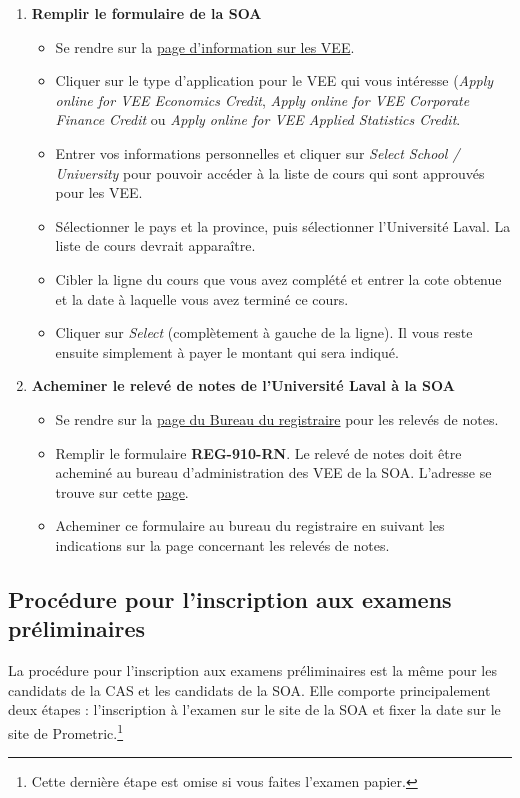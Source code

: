 \begin{enumerate}
\item \textbf{Remplir le formulaire de la SOA}
\begin{itemize}
\item Se rendre sur la \href{https://soa.org/education/exam-req/edu-vee.aspx}{page d'information sur les VEE}. 
\item Cliquer sur le type d'application pour le VEE qui vous intéresse (\textit{Apply online for VEE Economics Credit}, \textit{Apply online for VEE Corporate Finance Credit} ou \textit{Apply online for VEE Applied Statistics Credit}.
\item Entrer vos informations personnelles et cliquer sur \textit{Select School / University} pour pouvoir accéder à la liste de cours qui sont approuvés pour les VEE.
\item Sélectionner le pays et la province, puis sélectionner l'Université Laval. La liste de cours devrait apparaître. \item Cibler la ligne du cours que vous avez complété et entrer la cote obtenue et la date à laquelle vous avez terminé ce cours. 
\item Cliquer sur \textit{Select} (complètement à gauche de la ligne). Il vous reste ensuite simplement à payer le montant qui sera indiqué.
\end{itemize}\vspace{\baselineskip}
\item \textbf{Acheminer le relevé de notes de l'Université Laval à la SOA}
\begin{itemize}
\item Se rendre sur la \href{https://www.reg.ulaval.ca/cms/DemDoc/releveNotes}{page du Bureau du registraire} pour les relevés de notes.
\item Remplir le formulaire \textbf{REG-910-RN}. Le relevé de notes doit être acheminé au bureau d'administration des VEE de la SOA. L'adresse se trouve sur cette \href{https://soa.org/education/exam-req/course-info/edu-vee-applying-process.aspx}{page}.
\item Acheminer ce formulaire au bureau du registraire en suivant les indications sur la page concernant les relevés de notes.
\end{itemize}
\end{enumerate}


\newpage
\subsection*{Procédure pour l'inscription aux examens préliminaires}
\label{subsec:inscriptionexams}
La procédure pour l'inscription aux examens préliminaires est la même pour les candidats de la CAS et les candidats de la SOA. Elle comporte principalement deux étapes : l'inscription à l'examen sur le site de la SOA et fixer la date sur le site de Prometric.\footnote{Cette dernière étape est omise si vous faites l'examen papier.}\vspace{\baselineskip} 

